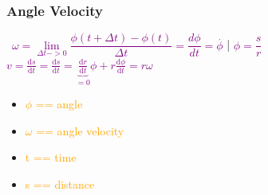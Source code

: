 \documentclass[main.tex,fontsize=8pt,paper=a4,paper=portrait,DIV=calc,]{scrartcl}
\begin{document}
\begin{multicols*}{2}
\subsubsection{Angle Velocity}
\, \newline
\large \textcolor{purple}{\( \omega = \underset{\Delta t -> 0}{\lim} \dfrac{\phi(t + \Delta t) - \phi(t)}{\Delta t} = \dfrac{d\phi}{dt} = \overset{.}{\phi} \)} | 
\large \textcolor{purple}{\( \phi = \dfrac{s}{r} \)}\newline
\large \textcolor{purple}{\( v = \frac{\mathrm{d}s}{\mathrm{d}t} = \frac{\mathrm{d}s}{\mathrm{d}t} = \underbrace{\frac{\mathrm{d}r}{\mathrm{d}t}}_{=0} \phi + r\frac{\mathrm{d}\phi}{\mathrm{d}t} = r\omega\quad\)}
\, \newline \normalsize
\begin{itemize}
\item \textcolor{orange}{\(\phi\) == angle}
\item \textcolor{orange}{\(\omega\) == angle velocity}
\item \textcolor{orange}{ t == time}
\item \textcolor{orange}{s == distance}

\end{itemize}


\end{multicols*}
\end{document}
